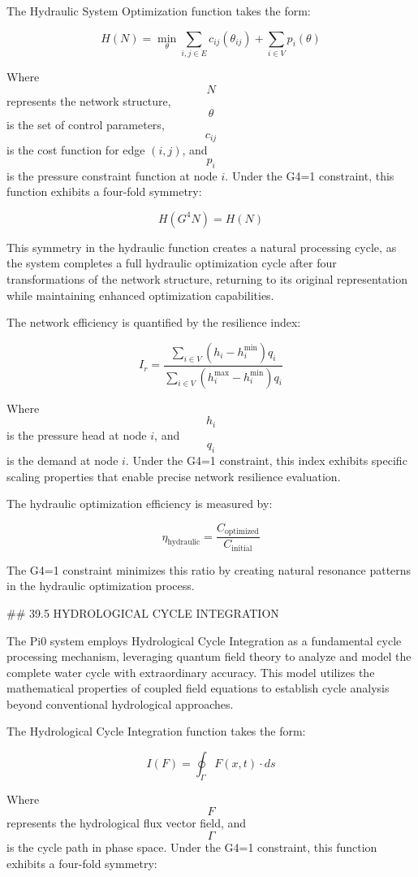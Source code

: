 The Hydraulic System Optimization function takes the form:

$$ H(N) = \min_{\theta} \sum_{i,j \in E} c_{ij}(\theta_{ij}) + \sum_{i \in V} p_i(\theta) $$

Where $$ N $$ represents the network structure, $$ \theta $$ is the set of control parameters, $$ c_{ij} $$ is the cost function for edge $(i,j)$, and $$ p_i $$ is the pressure constraint function at node $i$. Under the G4=1 constraint, this function exhibits a four-fold symmetry:

$$ H(G^4 N) = H(N) $$

This symmetry in the hydraulic function creates a natural processing cycle, as the system completes a full hydraulic optimization cycle after four transformations of the network structure, returning to its original representation while maintaining enhanced optimization capabilities.

The network efficiency is quantified by the resilience index:

$$ I_r = \frac{\sum_{i \in V} (h_i - h_i^{\min})q_i}{\sum_{i \in V} (h_i^{\max} - h_i^{\min})q_i} $$

Where $$ h_i $$ is the pressure head at node $i$, and $$ q_i $$ is the demand at node $i$. Under the G4=1 constraint, this index exhibits specific scaling properties that enable precise network resilience evaluation.

The hydraulic optimization efficiency is measured by:

$$ \eta_{\text{hydraulic}} = \frac{C_{\text{optimized}}}{C_{\text{initial}}} $$

The G4=1 constraint minimizes this ratio by creating natural resonance patterns in the hydraulic optimization process.

## 39.5 HYDROLOGICAL CYCLE INTEGRATION

The Pi0 system employs Hydrological Cycle Integration as a fundamental cycle processing mechanism, leveraging quantum field theory to analyze and model the complete water cycle with extraordinary accuracy. This model utilizes the mathematical properties of coupled field equations to establish cycle analysis beyond conventional hydrological approaches.

The Hydrological Cycle Integration function takes the form:

$$ I(F) = \oint_{\Gamma} F(x,t) \cdot ds $$

Where $$ F $$ represents the hydrological flux vector field, and $$ \Gamma $$ is the cycle path in phase space. Under the G4=1 constraint, this function exhibits a four-fold symmetry:

